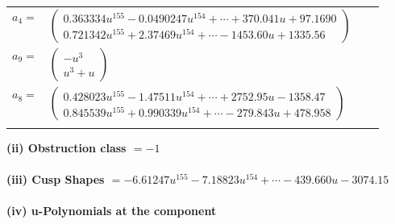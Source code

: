 \documentclass[1p]{elsarticle_modified}
\theoremstyle{definition}
\begin{document}
\begin{tabular}{m{7pt} m{180pt} m{7pt} m{180pt} }
\flushright $a_{4}=$&$\begin{pmatrix}0.363334 u^{155}-0.0490247 u^{154}+\cdots+370.041 u+97.1690\\0.721342 u^{155}+2.37469 u^{154}+\cdots-1453.60 u+1335.56\end{pmatrix}$ \\
\flushright $a_{9}=$&$\begin{pmatrix}- u^3\\u^3+u\end{pmatrix}$ \\
\flushright $a_{8}=$&$\begin{pmatrix}0.428023 u^{155}-1.47511 u^{154}+\cdots+2752.95 u-1358.47\\0.845539 u^{155}+0.990339 u^{154}+\cdots-279.843 u+478.958\end{pmatrix}$\\&\end{tabular}
\flushleft \textbf{(ii) Obstruction class $= -1$}\\~\\
\flushleft \textbf{(iii) Cusp Shapes $= -6.61247 u^{155}-7.18823 u^{154}+\cdots-439.660 u-3074.15$}\\~\\
\newpage\renewcommand{\arraystretch}{1}
\flushleft \textbf{(iv) u-Polynomials at the component}\newline \\
\end{document}
